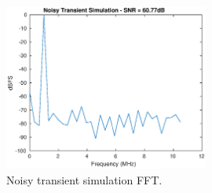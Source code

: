\documentclass[letterpaper, notitlepage]{revtex4-1}
\begin{document}
\begin{figure}[h]
\begin{center}
\includegraphics[width=0.6\textwidth]{noisy_transient_fft.eps}
\caption{Noisy transient simulation FFT.}
\label{fig:NoisyTransientFFT}
\end{center}
\end{figure}
\end{document}
